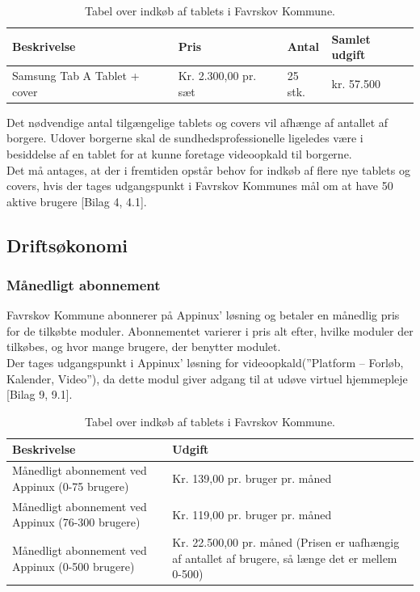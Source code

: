 \begin{table}[H]
	\caption{Tabel over indkøb af tablets i Favrskov Kommune.}
	\centering
	\label{tab:tabelindkoeb}
	\begin{tabular}{|l|l|l|l|}
		\hline
		\textbf{Beskrivelse} & \textbf{Pris} & \textbf{Antal} & \textbf{Samlet udgift}\\ \hline
		Samsung Tab A Tablet + cover & Kr. 2.300,00 pr. sæt & 25 stk. & kr. 57.500\\ \hline
	\end{tabular}
\end{table}
Det nødvendige antal tilgængelige tablets og covers vil afhænge af antallet af borgere. Udover borgerne skal de sundhedsprofessionelle ligeledes være i besiddelse af en tablet for at kunne foretage videoopkald til borgerne. \\
Det må antages, at der i fremtiden opstår behov for indkøb af flere nye tablets og covers, hvis der tages udgangspunkt i Favrskov Kommunes mål om at have 50 aktive brugere [Bilag 4, 4.1].
\subsection{Driftsøkonomi}
\subsubsection{Månedligt abonnement}
Favrskov Kommune abonnerer på Appinux’ løsning og betaler en månedlig pris for de tilkøbte moduler. Abonnementet varierer i pris alt efter, hvilke moduler der tilkøbes, og hvor mange brugere, der benytter modulet. \\
Der tages udgangspunkt i Appinux’ løsning for videoopkald(”Platform – Forløb, Kalender, Video”), da dette modul giver adgang til at udøve virtuel hjemmepleje [Bilag 9, 9.1].

\begin{table}[H]
	\caption{Tabel over indkøb af tablets i Favrskov Kommune.}
	\centering
	\label{tab:tabelmaanedudgift}
	\begin{tabularx}{\textwidth}{|X|X|}
		\hline
		\textbf{Beskrivelse} & \textbf{Udgift}\\ \hline
		Månedligt abonnement ved Appinux 
		(0-75 brugere)
		 & Kr. 139,00 pr. bruger pr. måned\\ 
		\hline
		Månedligt abonnement ved Appinux 
		(76-300 brugere)
		& Kr. 119,00 pr. bruger pr. måned\\ \hline
				Månedligt abonnement ved Appinux 
				(0-500 brugere)
				& Kr. 22.500,00 pr. måned (Prisen er uafhængig af antallet af brugere, så længe det er mellem 0-500)\\ \hline
	\end{tabularx}
\end{table}

